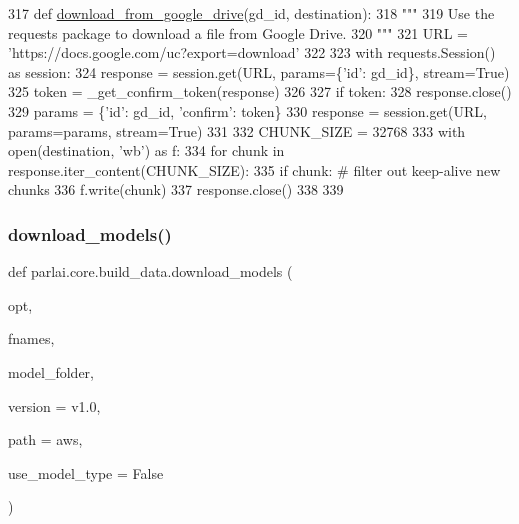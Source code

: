 \begin{DoxyCode}
317 \textcolor{keyword}{def }\hyperlink{namespaceparlai_1_1core_1_1build__data_ac9224da5c4e4ce9d1f4ab05e837c1f45}{download\_from\_google\_drive}(gd\_id, destination):
318     \textcolor{stringliteral}{"""}
319 \textcolor{stringliteral}{    Use the requests package to download a file from Google Drive.}
320 \textcolor{stringliteral}{    """}
321     URL = \textcolor{stringliteral}{'https://docs.google.com/uc?export=download'}
322 
323     with requests.Session() \textcolor{keyword}{as} session:
324         response = session.get(URL, params=\{\textcolor{stringliteral}{'id'}: gd\_id\}, stream=\textcolor{keyword}{True})
325         token = \_get\_confirm\_token(response)
326 
327         \textcolor{keywordflow}{if} token:
328             response.close()
329             params = \{\textcolor{stringliteral}{'id'}: gd\_id, \textcolor{stringliteral}{'confirm'}: token\}
330             response = session.get(URL, params=params, stream=\textcolor{keyword}{True})
331 
332         CHUNK\_SIZE = 32768
333         with open(destination, \textcolor{stringliteral}{'wb'}) \textcolor{keyword}{as} f:
334             \textcolor{keywordflow}{for} chunk \textcolor{keywordflow}{in} response.iter\_content(CHUNK\_SIZE):
335                 \textcolor{keywordflow}{if} chunk:  \textcolor{comment}{# filter out keep-alive new chunks}
336                     f.write(chunk)
337         response.close()
338 
339 
\end{DoxyCode}
\mbox{\label{namespaceparlai_1_1core_1_1build__data_ab697f23f05d3e36d7979fe5e0ed7911e}} 
\subsubsection{\texorpdfstring{download\+\_\+models()}{download\_models()}}
{\footnotesize\ttfamily def parlai.\+core.\+build\+\_\+data.\+download\+\_\+models (\begin{DoxyParamCaption}\item[{}]{opt,  }\item[{}]{fnames,  }\item[{}]{model\+\_\+folder,  }\item[{}]{version = {\ttfamily \textquotesingle{}v1.0\textquotesingle{}},  }\item[{}]{path = {\ttfamily \textquotesingle{}aws\textquotesingle{}},  }\item[{}]{use\+\_\+model\+\_\+type = {\ttfamily False} }\end{DoxyParamCaption})}

